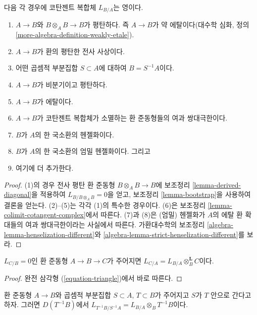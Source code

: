 \begin{lemma}
\label{lemma-when-zero}
다음 각 경우에 코탄젠트 복합체 $L_{B/A}$는 영이다.
\begin{enumerate}
\item $A\to B$와 $B\otimes_AB\to B$가 평탄하다. 즉 $A\to B$가
약 에탈이다(대수학 심화, 정의
\ref{more-algebra-definition-weakly-etale}).
\item $A\to B$가 환의 평탄한 전사 사상이다.
\item 어떤 곱셈적 부분집합 $S\subset A$에 대하여 $B=S^{-1}A$이다.
\item $A\to B$가 비분기이고 평탄하다.
\item $A\to B$가 에탈이다.
\item $A\to B$가 코탄젠트 복합체가 소멸하는 환 준동형들의 여과
쌍대극한이다.
\item $B$가 $A$의 한 국소환의 헨젤화이다.
\item $B$가 $A$의 한 국소환의 엄밀 헨젤화이다. 그리고
\item 여기에 더 추가한다.
\end{enumerate}
\end{lemma}

\begin{proof}
(1)의 경우 전사 평탄 환 준동형 $B\otimes_AB\to B$에 보조정리
\ref{lemma-derived-diagonal}을 적용하여 $L_{B/B\otimes_AB}=0$을 얻고,
보조정리 \ref{lemma-bootstrap}을 사용하여 결론을 얻는다. (2)--(5)는 각각
(1)의 특수한 경우이다. (6)은 보조정리
\ref{lemma-colimit-cotangent-complex}에서 따른다. (7)과 (8)은 (엄밀)
헨젤화가 $A$의 에탈 환 확대들의 여과 쌍대극한이라는 사실에서 따른다.
가환대수학의 보조정리 \ref{algebra-lemma-henselization-different}와
\ref{algebra-lemma-strict-henselization-different}를 보라.
\end{proof}

\begin{lemma}
\label{lemma-localize-on-top}
$L_{C/B}=0$인 환 준동형 $A\to B\to C$가 주어지면
$L_{C/A}=L_{B/A}\otimes_B^\mathbf{L}C$이다.
\end{lemma}

\begin{proof}
완전 삼각형 (\ref{equation-triangle})에서 바로 따른다.
\end{proof}

\begin{lemma}
\label{lemma-localize}
환 준동형 $A\to B$와 곱셈적 부분집합 $S\subset A$, $T\subset B$가
주어지고 $S$가 $T$ 안으로 간다고 하자. 그러면 $D(T^{-1}B)$에서
$L_{T^{-1}B/S^{-1}A}=L_{B/A}\otimes_BT^{-1}B$이다.
\end{lemma}

